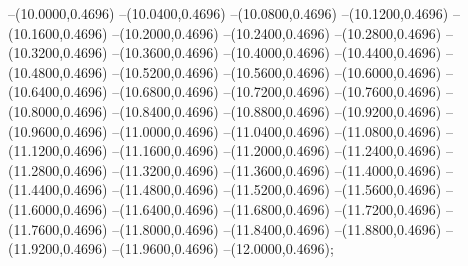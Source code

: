 {	--(10.0000,0.4696)
	--(10.0400,0.4696)
	--(10.0800,0.4696)
	--(10.1200,0.4696)
	--(10.1600,0.4696)
	--(10.2000,0.4696)
	--(10.2400,0.4696)
	--(10.2800,0.4696)
	--(10.3200,0.4696)
	--(10.3600,0.4696)
	--(10.4000,0.4696)
	--(10.4400,0.4696)
	--(10.4800,0.4696)
	--(10.5200,0.4696)
	--(10.5600,0.4696)
	--(10.6000,0.4696)
	--(10.6400,0.4696)
	--(10.6800,0.4696)
	--(10.7200,0.4696)
	--(10.7600,0.4696)
	--(10.8000,0.4696)
	--(10.8400,0.4696)
	--(10.8800,0.4696)
	--(10.9200,0.4696)
	--(10.9600,0.4696)
	--(11.0000,0.4696)
	--(11.0400,0.4696)
	--(11.0800,0.4696)
	--(11.1200,0.4696)
	--(11.1600,0.4696)
	--(11.2000,0.4696)
	--(11.2400,0.4696)
	--(11.2800,0.4696)
	--(11.3200,0.4696)
	--(11.3600,0.4696)
	--(11.4000,0.4696)
	--(11.4400,0.4696)
	--(11.4800,0.4696)
	--(11.5200,0.4696)
	--(11.5600,0.4696)
	--(11.6000,0.4696)
	--(11.6400,0.4696)
	--(11.6800,0.4696)
	--(11.7200,0.4696)
	--(11.7600,0.4696)
	--(11.8000,0.4696)
	--(11.8400,0.4696)
	--(11.8800,0.4696)
	--(11.9200,0.4696)
	--(11.9600,0.4696)
	--(12.0000,0.4696);
}

